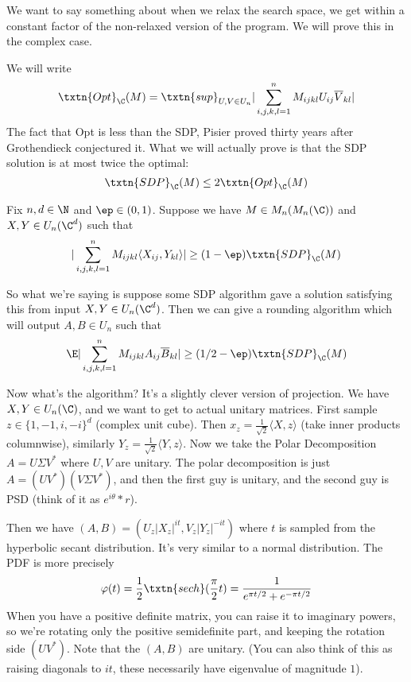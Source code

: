 We want to say something about when we relax the search space, we get within a constant factor of the non-relaxed version of the program. We will prove this in the complex case.

We will write 
\[
\txtn{Opt}_{\C}(M) = \txtn{sup}_{U, V \in U_n} |\sum_{i, j, k, l = 1}^n M_{ijkl} U_{ij} \overline{V}_{kl}|
\]
The fact that Opt is less than the SDP, Pisier proved thirty years after Grothendieck conjectured it. 
What we will actually prove is that the SDP solution is at most twice the optimal: 
\[
\txtn{SDP}_{\C}(M) \leq 2 \txtn{Opt}_{\C}(M)
\]

\begin{thm} Fix $n, d \in \N$ and $\ep \in (0, 1)$. Suppose we have $M \in M_n(M_n(\C))$ and $X, Y \in U_n(\C^d)$ such that 
\[
|\sum_{i, j, k , l = 1}^n M_{ijkl} \langle X_{ij}, Y_{kl} \rangle | \geq (1 - \ep) \txtn{SDP}_{\C}(M)
\]
\end{thm}

So what we're saying is suppose some SDP algorithm gave a solution satisfying this from input $X, Y \in U_n(\C^d)$. Then we can give a rounding algorithm which will output $A, B \in U_n$ such that 
\[
\E |\sum_{i, j, k, l = 1}^n M_{ijkl} A_{ij}\overline{B}_{kl}| \geq (1/2 - \ep)\txtn{SDP}_{\C}(M)
\]

Now what's the algorithm? It's a slightly clever version of projection. We have $X, Y \in U_n(\C)$, and we want to get to actual unitary matrices. First sample $z \in \{1, -1, i, -i\}^d$ (complex unit cube). Then $x_{z} = \frac{1}{\sqrt{2}}\langle X, z \rangle$ (take inner products columnwise), similarly $Y_z = \frac{1}{\sqrt{2}}\langle Y, z \rangle$. Now we take the Polar Decomposition $A = U\Sigma V^*$ where $U, V$ are unitary. The polar decomposition is just $A = (UV^*)(V\Sigma V^*)$, and then the first guy is unitary, and the second guy is PSD (think of it as $e^{i\theta} * r$). 

Then we have $(A, B) = (U_z|X_z|^{it}, V_z|Y_z|^{-it})$ where $t$ is sampled from the hyperbolic secant distribution. It's very similar to a normal distribution. The PDF is more precisely
\[
\varphi(t) = \frac{1}{2} \txtn{sech}(\frac{\pi}{2}t) = \frac{1}{e^{\pi t/2} + e^{-\pi t/2}}
\]
When you have a positive definite matrix, you can raise it to imaginary powers, so we're rotating only the positive semidefinite part, and keeping the rotation side $(UV^*)$. 
Note that the $(A, B)$ are unitary. (You can also think of this as raising diagonals to $it$, these necessarily have eigenvalue of magnitude $1$).
